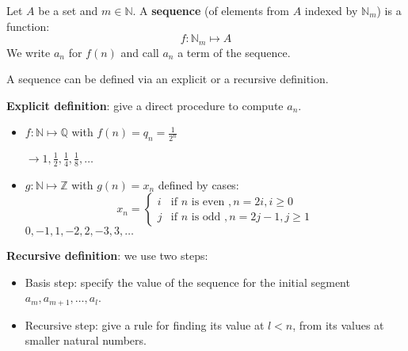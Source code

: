 \documentclass[12pt, a4paper]{book}
\begin{document}
\begin{defn}
    Let $A$ be a set and $m\in\mathbb{N}$. A \textbf{sequence} (of elements from $A$ indexed by $\mathbb{N}_m$) is a function:
    \[
        f:\mathbb{N}_m \mapsto A
    \]
    We write $a_n$ for $f(n)$ and call $a_n$ a term of the sequence.
\end{defn}

A sequence can be defined via an explicit or a recursive definition.

\begin{defn}
    \textbf{Explicit definition}: give a direct procedure to compute $a_n$.
    \begin{itemize}
        \item $f:\mathbb{N} \mapsto \mathbb{Q}$ with $\displaystyle f(n) = q_n = \frac{1}{2^n}$

        $\longrightarrow \displaystyle 1, \frac{1}{2}, \frac{1}{4}, \frac{1}{8}, \ldots$
        \item $g:\mathbb{N} \mapsto \mathbb{Z}$ with $g(n) = x_n$ defined by cases:
        \[
            x_n = 
            \begin{cases}
                i & \text{if } n \text{ is even }, n=2i, i \geq 0 \\
                j & \text{if } n \text{ is odd }, n=2j-1, j \geq 1
            \end{cases}
        \]
        $0,-1,1,-2,2,-3,3,\ldots$
    \end{itemize}
\end{defn}

\begin{defn}
    \textbf{Recursive definition}: we use two steps:
    \begin{itemize}
        \item Basis step: specify the value of the sequence for the initial segment $a_m,a_{m+1},\ldots,a_l$.
        \item Recursive step: give a rule for finding its value at $l<n$, from its values at smaller natural numbers.
    \end{itemize}
\end{defn}
\end{document}
